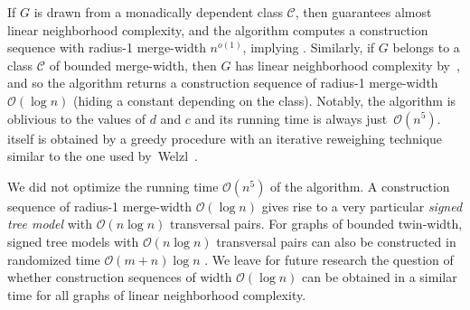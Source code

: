 \documentclass[11pt]{article}
\theoremstyle{definition}
\newcommand{\CC}{{\mathscr C}}
\newcommand{\Oh}{\mathcal{O}}
\begin{document}

If $G$ is drawn from a monadically dependent class $\CC$,
then  guarantees almost linear neighborhood complexity,
and the algorithm computes a construction sequence with \mbox{radius-1} merge-width $n^{o(1)}$, implying .
Similarly, if $G$ belongs to a class $\CC$ of bounded merge-width, then $G$ has linear neighborhood complexity by~\cite{bonamy2025chiboundednessneighbourhoodcomplexitybounded}, and so the algorithm returns a construction sequence of radius-1 merge-width $\mathcal{O}(\log{n})$ (hiding a constant depending on the class). Notably, the algorithm is oblivious to the values of $d$ and $c$ and its running time is always just~$\mathcal{O}(n^5)$.  itself is obtained by a greedy procedure with an iterative reweighing technique similar to the one used by~Welzl~\cite{Welzl88}. 

We did not optimize the running time $\mathcal{O}(n^5)$ of the algorithm. 
A construction sequence 
of radius-1 merge-width $\mathcal{O}(\log{n})$ gives rise to a very particular \emph{signed tree model} with $\mathcal{O}(n\log{n})$ transversal pairs. For graphs of bounded twin-width, signed tree models with $\mathcal{O}(n\log{n})$ transversal pairs can also be constructed in randomized time $\Oh(m+n)\log n$ \cite[Thm. 4]{bonnet2026fastshortestpathgraphs}. 
We leave for future research the question of whether construction sequences of width $\Oh(\log n)$ can be obtained in a similar time for all graphs of linear neighborhood complexity.
\end{document}

